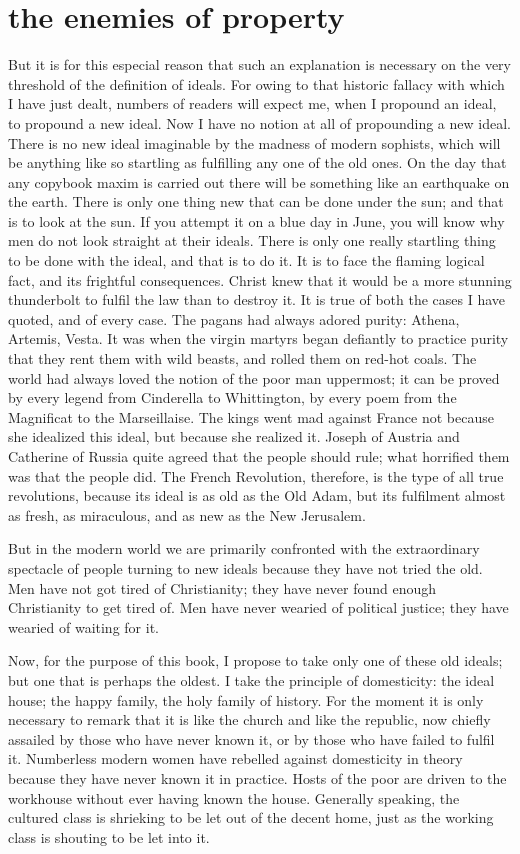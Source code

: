 \documentclass[final,10pt,letterpaper,twocolumn,openany]{book}
\begin{document}
\section{the enemies of property}

    But it is for this especial reason that such an explanation is necessary
on the very threshold of the definition of ideals. For owing to that historic
fallacy with which I have just dealt, numbers of readers will expect me,
when I propound an ideal, to propound a new ideal. Now I have no notion
at all of propounding a new ideal. There is no new ideal imaginable by the
madness of modern sophists, which will be anything like so startling as
fulfilling any one of the old ones. On the day that any copybook maxim is
carried out there will be something like an earthquake on the earth. There
is only one thing new that can be done under the sun; and that is to look at
the sun. If you attempt it on a blue day in June, you will know why men
do not look straight at their ideals. There is only one really startling thing
to be done with the ideal, and that is to do it. It is to face the flaming
logical fact, and its frightful consequences. Christ knew that it would be a
more stunning thunderbolt to fulfil the law than to destroy it. It is true of
both the cases I have quoted, and of every case. The pagans had always
adored purity: Athena, Artemis, Vesta. It was when the virgin martyrs
began defiantly to practice purity that they rent them with wild beasts, and
rolled them on red-hot coals. The world had always loved the notion of the
poor man uppermost; it can be proved by every legend from Cinderella to
Whittington, by every poem from the Magnificat to the Marseillaise. The
kings went mad against France not because she idealized this ideal, but
because she realized it. Joseph of Austria and Catherine of Russia quite
agreed that the people should rule; what horrified them was that the people
did. The French Revolution, therefore, is the type of all true revolutions,
because its ideal is as old as the Old Adam, but its fulfilment almost as
fresh, as miraculous, and as new as the New Jerusalem.

But in the modern world we are primarily confronted with the
extraordinary spectacle of people turning to new ideals because they have
not tried the old. Men have not got tired of Christianity; they have never
found enough Christianity to get tired of. Men have never wearied of
political justice; they have wearied of waiting for it.

Now, for the purpose of this book, I propose to take only one of these
old ideals; but one that is perhaps the oldest. I take the principle of
domesticity: the ideal house; the happy family, the holy family of history.
For the moment it is only necessary to remark that it is like the church and
like the republic, now chiefly assailed by those who have never known it,
or by those who have failed to fulfil it. Numberless modern women have
rebelled against domesticity in theory because they have never known it in
practice. Hosts of the poor are driven to the workhouse without ever
having known the house. Generally speaking, the cultured class is
shrieking to be let out of the decent home, just as the working class is
shouting to be let into it.
\end{document}

